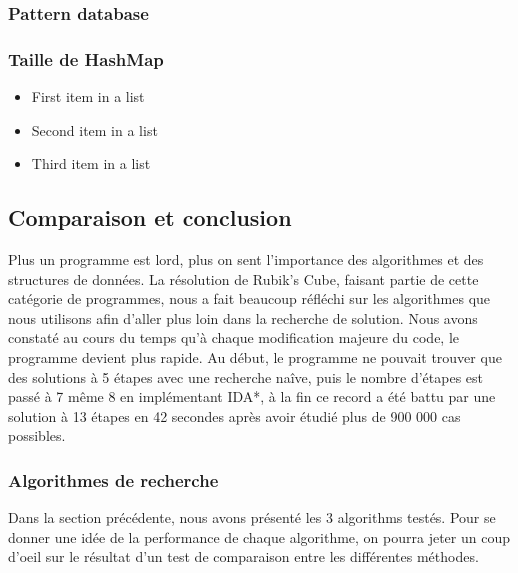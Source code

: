 \documentclass[fleqn,10pt,french]{SelfArx} %
\begin{document}
\subsubsection{Pattern database}

\lipsum[13] %

\subsubsection{Taille de HashMap}

\lipsum[13] %

\begin{itemize}[noitemsep] %
\item First item in a list
\item Second item in a list
\item Third item in a list
\end{itemize}

\subsection{Comparaison et conclusion}

Plus un programme est lord, plus on sent l’importance des algorithmes et des structures de données. La résolution de Rubik’s Cube, faisant partie de cette catégorie de programmes, nous a fait beaucoup réfléchi sur les algorithmes que nous utilisons afin d’aller plus loin dans la recherche de solution. Nous avons constaté au cours du temps qu’à chaque modification majeure du code, le programme devient plus rapide. Au début, le programme ne pouvait trouver que des solutions à 5 étapes avec une recherche naîve, puis le nombre d’étapes est passé à 7 même 8 en implémentant IDA*, à la fin ce record a été battu par une solution à 13 étapes en 42 secondes après avoir étudié plus de 900 000 cas possibles. 

\subsubsection{Algorithmes de recherche}

Dans la section précédente, nous avons présenté les 3 algorithms testés. Pour se donner une idée de la performance de chaque algorithme, on pourra jeter un coup d’oeil sur le résultat d’un test de comparaison entre les différentes méthodes. 
\end{document}
